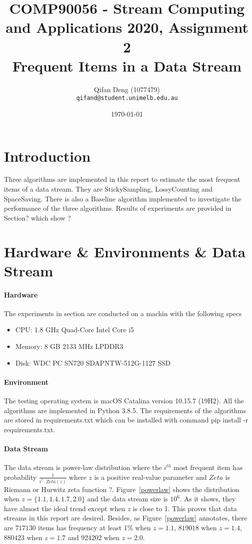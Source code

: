 \documentclass[10pt]{article}
\title{COMP90056 - Stream Computing and Applications 2020, Assignment 2 
\\Frequent Items in a Data Stream}
\author{
  Qifan Deng (1077479)\\
  \texttt{qifand@student.unimelb.edu.au} }
\date{\printdayoff\normalsize\today}
\begin{document}
\sloppy
\maketitle

\section{Introduction}
Three algorithms are implemented in this report to estimate the most frequent items of a data stream.
They are StickySampling, LossyCounting and SpaceSaving. 
There is also a Baseline algorithm implemented to investigate the performance of the three algorithms.
Results of experiments are provided in Section? which show ? 

\section{Hardware \& Environments \& Data Stream}

\paragraph{Hardware}
The experiments in section are conducted on a machin with the following specs
\begin{itemize}
     \setlength\itemsep{1pt}
       \item CPU: 1.8 GHz Quad-Core Intel Core i5
       \item Memory: 8 GB 2133 MHz LPDDR3
       \item Disk: WDC PC SN720 SDAPNTW-512G-1127 SSD
\end{itemize}
\paragraph{Environment}
The testing operating system is macOS Catalina version 10.15.7 (19H2).
All the algorithms are implemented in Python 3.8.5.
The requirements of the algorithms are stored in requirements.txt which can be installed with command pip install -r requirements.txt.

\paragraph{Data Stream}
The data stream is power-law distribution where 
the $i^{th}$ most frequent item has probability $\frac{1}{i^{z} \cdot{} Zeta(z)}$
where $z$ is a positive real-value parameter and $Zeta$ is Riemann or Hurwitz zeta function ?. 
Figure~\ref{powerlaw} shows the distribution when $z = \{1.1, 1.4, 1.7, 2.0\}$ and the data stream size is $10^6$.
As it shows, they have almost the ideal trend except when $z$ is close to 1. 
This proves that data streams in this report are desired.
Besides, as Figure~\ref{powerlaw} annotates, there are $717130$ items has frequency at least 1\% when $z=1.1$,  
$819018$ when  $z=1.4$, $880423$ when $z=1.7$ and $924202$ when $z=2.0$.
\end{document}
